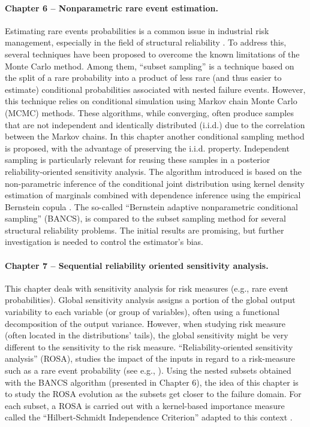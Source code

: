 \paragraph{Chapter 6 -- Nonparametric rare event estimation.} 
Estimating rare events probabilities is a common issue in industrial risk management, especially in the field of structural reliability \citep{chabridon_2018_thesis}. 
To address this, several techniques have been proposed to overcome the known limitations of the Monte Carlo method. 
Among them, ``subset sampling'' \citep{AuBeck2001} is a technique based on the split of a rare probability into a product of less rare (and thus easier to estimate) conditional probabilities associated with nested failure events. 
However, this technique relies on conditional simulation using Markov chain Monte Carlo (MCMC) methods. 
These algorithms, while converging, often produce samples that are not independent and identically distributed (i.i.d.) due to the correlation between the Markov chains.
In this chapter another conditional sampling method is proposed, with the advantage of preserving the i.i.d. property. 
Independent sampling is particularly relevant for reusing these samples in a posterior reliability-oriented sensitivity analysis. 
The algorithm introduced is based on the non-parametric inference of the conditional joint distribution using kernel density estimation of marginals combined with dependence inference using the empirical Bernstein copula \citep{sancetta_satchell_2004}. 
The so-called ``Bernstein adaptive nonparametric conditional sampling'' (BANCS), is compared to the subset sampling method for several structural reliability problems. 
The initial results are promising, but further investigation is needed to control the estimator's bias.


\paragraph{Chapter 7 -- Sequential reliability oriented sensitivity analysis.} 
This chapter deals with sensitivity analysis for risk measures (e.g., rare event probabilities). 
Global sensitivity analysis \citep{daveiga_iooss_2021} assigns a portion of the global output variability to each variable (or group of variables), often using a functional decomposition of the output variance. 
However, when studying risk measure (often located in the distributions' tails), the global sensitivity might be very different to the sensitivity to the risk measure. 
``Reliability-oriented sensitivity analysis'' (ROSA), studies the impact of the inputs in regard to a risk-measure such as a rare event probability (see e.g., \citet{chabridon_2018_thesis}). 
Using the nested subsets obtained with the BANCS algorithm (presented in Chapter 6), the idea of this chapter is to study the ROSA evolution as the subsets get closer to the failure domain. 
For each subset, a ROSA is carried out with a kernel-based importance measure called the ``Hilbert-Schmidt Independence Criterion'' adapted to this context \citep{marrel_chabridon_2021}. 

